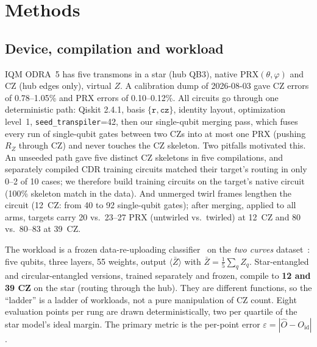 \documentclass[conference]{IEEEtran}
\newcommand{\ev}[1]{\langle #1\rangle}
\newcommand{\Oid}{O_{\mathrm{id}}}
\newcommand{\PRX}{\mathrm{PRX}}
\begin{document}
\section{Methods}\label{sec:methods}

\subsection{Device, compilation and workload}
IQM ODRA~5 has five transmons in a star (hub QB3), native $\PRX(\theta,\varphi)$ and CZ (hub
edges only), virtual $Z$. A calibration dump of 2026-08-03 gave CZ errors of 0.78--1.05\% and
PRX errors of 0.10--0.12\%. All circuits go through one deterministic path: Qiskit
\cite{qiskit2024} 2.4.1, basis $\{\texttt{r},\texttt{cz}\}$, identity layout, optimization
level~1, \texttt{seed\_transpiler}=42, then our single-qubit merging pass, which fuses every
run of single-qubit gates between two CZs into at most one PRX (pushing $R_Z$ through CZ) and
never touches the CZ skeleton. Two pitfalls motivated this. An unseeded path gave five
distinct CZ skeletons in five compilations, and separately compiled CDR training circuits
matched their target's routing in only 0--2 of 10 cases; we therefore build training circuits
on the target's native circuit (100\% skeleton match in the data). And unmerged twirl frames
lengthen the circuit (12~CZ: from 40 to 92 single-qubit gates); after merging, applied to all
arms, targets carry 20 vs.\ 23--27 PRX (untwirled vs.\ twirled) at 12~CZ and 80 vs.\ 80--83 at
39~CZ.

The workload is a frozen data-re-uploading classifier~\cite{perezsalinas2020,schuld2021} on
the \emph{two curves} dataset~\cite{bowles2024}: five qubits, three layers, 55 weights, output
$\ev{\bar Z}$ with $\bar Z=\frac15\sum_qZ_q$. Star-entangled and circular-entangled versions,
trained separately and frozen, compile to \textbf{12 and 39 CZ} on the star (routing through
the hub). They are different functions, so the ``ladder'' is a ladder of workloads, not a
pure manipulation of CZ count. Eight evaluation points per rung are drawn deterministically,
two per quartile of the star model's ideal margin. The primary metric is the per-point error
$\varepsilon=|\hat O-\Oid|$.
\end{document}
